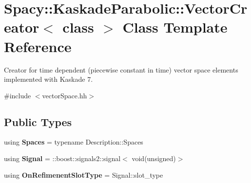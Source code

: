 \hypertarget{classSpacy_1_1KaskadeParabolic_1_1VectorCreator}{\section{Spacy\-:\-:Kaskade\-Parabolic\-:\-:Vector\-Creator$<$ class $>$ Class Template Reference}
\label{classSpacy_1_1KaskadeParabolic_1_1VectorCreator}
}


Creator for time dependent (piecewise constant in time) vector space elements implemented with Kaskade 7.  




{\ttfamily \#include $<$vector\-Space.\-hh$>$}

\subsection*{Public Types}
\begin{DoxyCompactItemize}
\item 
\hypertarget{classSpacy_1_1KaskadeParabolic_1_1VectorCreator_a1c178d245f485613615adebb58d5a1fc}{using {\bfseries Spaces} = typename Description\-::\-Spaces}\label{classSpacy_1_1KaskadeParabolic_1_1VectorCreator_a1c178d245f485613615adebb58d5a1fc}

\item 
\hypertarget{classSpacy_1_1KaskadeParabolic_1_1VectorCreator_a66f24ea0ddcd3f8a707820c35efbce6e}{using {\bfseries Signal} = \-::boost\-::signals2\-::signal$<$ void(unsigned)$>$}\label{classSpacy_1_1KaskadeParabolic_1_1VectorCreator_a66f24ea0ddcd3f8a707820c35efbce6e}

\item 
\hypertarget{classSpacy_1_1KaskadeParabolic_1_1VectorCreator_a17ab3b21d3895556d3b477b030272ab8}{using {\bfseries On\-Refimenent\-Slot\-Type} = Signal\-::slot\-\_\-type}\label{classSpacy_1_1KaskadeParabolic_1_1VectorCreator_a17ab3b21d3895556d3b477b030272ab8}

\end{DoxyCompactItemize}
